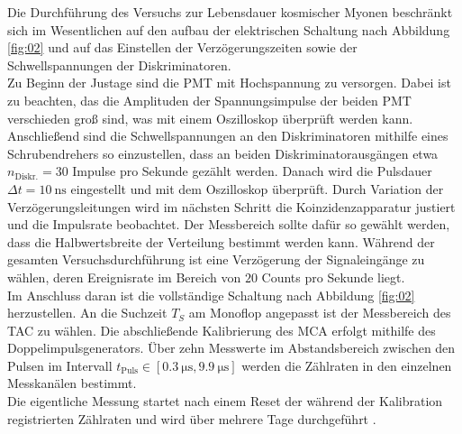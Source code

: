 \noindent Die Durchführung des Versuchs zur Lebensdauer kosmischer Myonen
beschränkt sich im Wesentlichen auf den aufbau der elektrischen Schaltung nach
Abbildung \ref{fig:02} und auf das Einstellen der Verzögerungszeiten sowie der
Schwellspannungen der Diskriminatoren. \\
\noindent Zu Beginn der Justage sind die PMT mit Hochspannung zu versorgen.
Dabei ist zu beachten, das die Amplituden der Spannungsimpulse der beiden
PMT verschieden groß sind, was mit einem Oszilloskop überprüft werden kann. \\
\noindent Anschließend sind die Schwellspannungen an den Diskriminatoren mithilfe
eines Schrubendrehers so einzustellen, dass an beiden Diskriminatorausgängen etwa
$n_\text{Diskr.} = 30$ Impulse pro Sekunde gezählt werden. Danach wird die
Pulsdauer $\Delta t = \SI{10}{\nano\second}$ eingestellt und mit dem Oszilloskop
überprüft. Durch Variation der Verzögerungsleitungen wird im nächsten Schritt die
Koinzidenzapparatur justiert und die Impulsrate beobachtet. Der Messbereich sollte
dafür so gewählt werden, dass die Halbwertsbreite der Verteilung bestimmt werden
kann. Während der gesamten Versuchsdurchführung ist eine Verzögerung der
Signaleingänge zu wählen, deren Ereignisrate im Bereich von $20$ Counts pro
Sekunde liegt. \\
\noindent Im Anschluss daran ist die vollständige Schaltung nach Abbildung
\ref{fig:02} herzustellen. An die Suchzeit $T_S$ am Monoflop angepasst ist der
Messbereich des TAC zu wählen. Die abschließende Kalibrierung des MCA erfolgt
mithilfe des Doppelimpulsgenerators. Über zehn Messwerte im Abstandsbereich
zwischen den Pulsen im Intervall $t_\text{Puls} \in
[\SI{0.3}{\micro\second},\SI{9.9}{\micro\second}]$ werden die Zählraten in den
einzelnen Messkanälen bestimmt. \\
\noindent Die eigentliche Messung startet nach einem Reset der während der
Kalibration registrierten Zählraten und wird über mehrere Tage durchgeführt
\cite{anleitung}. 
